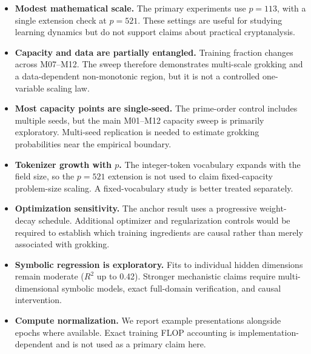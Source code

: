 \documentclass[twoside,11pt]{article}
\begin{document}
\begin{itemize}[leftmargin=*]
    \item \textbf{Modest mathematical scale.} The primary experiments use $p=113$, with a single extension check at $p=521$. These settings are useful for studying learning dynamics but do not support claims about practical cryptanalysis.

    \item \textbf{Capacity and data are partially entangled.} Training fraction changes across M07--M12. The sweep therefore demonstrates multi-scale grokking and a data-dependent non-monotonic region, but it is not a controlled one-variable scaling law.

    \item \textbf{Most capacity points are single-seed.} The prime-order control includes multiple seeds, but the main M01--M12 capacity sweep is primarily exploratory. Multi-seed replication is needed to estimate grokking probabilities near the empirical boundary.

    \item \textbf{Tokenizer growth with $p$.} The integer-token vocabulary expands with the field size, so the $p=521$ extension is not used to claim fixed-capacity problem-size scaling. A fixed-vocabulary study is better treated separately.

    \item \textbf{Optimization sensitivity.} The anchor result uses a progressive weight-decay schedule. Additional optimizer and regularization controls would be required to establish which training ingredients are causal rather than merely associated with grokking.

    \item \textbf{Symbolic regression is exploratory.} Fits to individual hidden dimensions remain moderate ($R^2$ up to 0.42). Stronger mechanistic claims require multi-dimensional symbolic models, exact full-domain verification, and causal intervention.

    \item \textbf{Compute normalization.} We report example presentations alongside epochs where available. Exact training FLOP accounting is implementation-dependent and is not used as a primary claim here.
\end{itemize}

\end{document}
